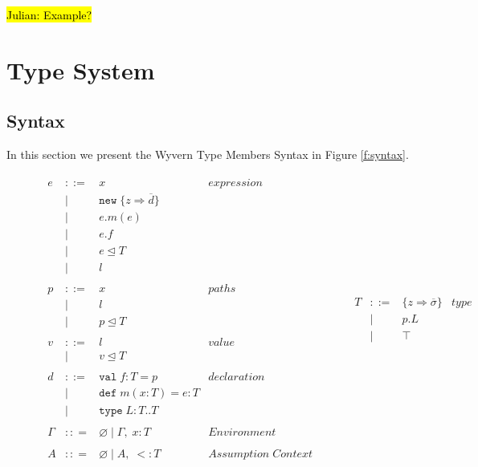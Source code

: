 \documentclass[11pt
              , a4paper
              , twoside
              , openright
              ]{report}
\numberwithin{case}{theorem}
\numberwithin{subcase}{case}
\begin{document}
\hl{Julian: Example?}


\section{Type System}

\subsection{Syntax} \label{s:syntax}
In this section we present the Wyvern Type Members Syntax 
in Figure \ref{f:syntax}. 

\begin{figure}[h]
\[
\begin{array}{lll}
\begin{array}{lllr}
e & ::= & x & expression \\
& | & \texttt{new} \; \{z \Rightarrow \overline{d}\}&\\
& | & e.m(e) &\\
& | & e.f &\\
& | & e \unlhd T&\\
& | & l &\\
&&\\
p & ::= & x & paths \\
& | & l &\\
& | & p \unlhd T &\\
&&\\
v & ::= & l & value \\
& | & v \unlhd T &\\
&&\\
d & ::= & \texttt{val} \; f : T = p & declaration \\
  & |   & \texttt{def} \; m(x:T) = e : T &\\
  & |   & \texttt{type} \; L : T .. T&\\
&&\\
\Gamma & :: = & \varnothing \; | \; \Gamma,\; x : T & Environment \\
&&\\
A & :: = & \varnothing \; | \; A,\;  <: T & Assumption \; Context \\
 \end{array}
& ~~~~~~
&
\begin{array}{lllr}
T & ::= & \{z \Rightarrow \overline{\sigma}\} & type \\
& | & p.L &\\
& | & \top & \\

\end{array}
\end{array}\]
\end{figure}
\end{document}
